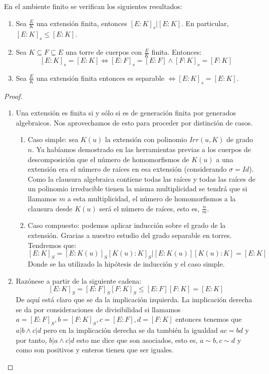 \begin{proposition}
En el ambiente finito se verifican los siguientes resultados:
\begin{enumerate}
\item Sea $\frac{E}{K}$ una extensión finita, entonces $[E:K]_s\Big|[E:K]$. En particular, $[E:K]_s \le [E:K]$.
\item Sea $K \subseteq F \subseteq E$ una torre de cuerpos con $\frac{E}{K}$ finita. Entonces: $$[E:K]_s = [E:K] \iff [E:F]_s = [E:F] \land [F:K]_s = [F:K]$$
\item Sea $\frac{E}{K}$ una extensión finita entonces es separable $\iff [E:K]_s = [E:K]$.
\end{enumerate}
\end{proposition}
\begin{proof}
\begin{enumerate}
\item Una extensión es finita si y sólo si es de generación finita por generados algebraicos. Nos aprovechamos de esto para proceder por distinción de casos. 

\begin{enumerate}
\item Caso simple: sea $K(u)$ la extensión con polinomio $Irr(u,K)$ de grado $n$. Ya habíamos demostrado en las herramientas previas a los cuerpos de descomposición que el número de homomorfismos de $K(u)$ a una extensión era el número de raíces en esa extensión (considerando $\sigma = Id$). Como la clausura algebraica contiene todas las raíces y todas las raíces de un polinomio irreducible tienen la misma multiplicidad se tendrá que si llamamos $m$ a esta multiplicidad, el número de homomorfismos a la clausura desde $K(u)$ será el número de raíces, esto es, $\frac{n}{m}$.
\item Caso compuesto: podemos aplicar inducción sobre el grado de la extensión. Gracias a nuestro estudio del grado separable en torres. Tendremos que: $$[E:K]_S = [E:K(u)]_S[K(u):K]_S | [E:K(u)][K(u):K] = [E:K]$$ Donde se ha utilizado la hipótesis de inducción y el caso simple.  
\end{enumerate}

\item Razónese a partir de la siguiente cadena: $$[E:K]_S = [E:F]_S[F:K]_S \le [E:F][F:K] = [E:K]$$ De aquí está claro que se da la implicación izquierda. La implicación derecha se da por consideraciones de divisibilidad si llamamos $a = [E:F]_S, b = [F:K]_S, c = [E:F], d = [F:K]$ entonces tenemos que $a|b \land c|d$ pero en la implicación derecha se da también la igualdad $ac = bd$ y por tanto, $b|a \land c|d$ esto me dice que son asociados, esto es, $a \sim b,c \sim d$ y como son positivos y enteros tienen que ser iguales. 


\end{enumerate}
\end{proof}
